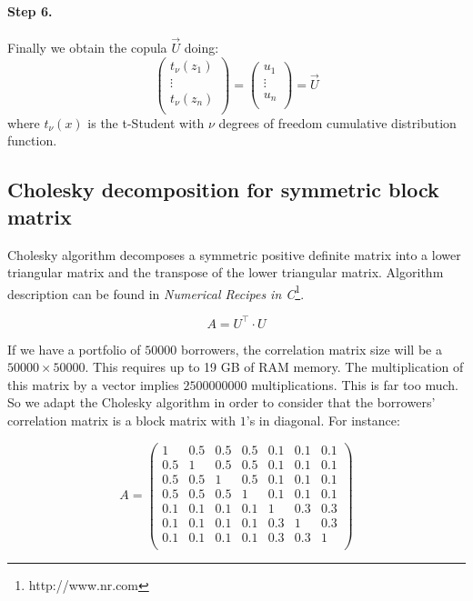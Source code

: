 \documentclass[a4paper,12pt,final]{article}
\begin{document}
\paragraph{Step 6.} Finally we obtain the copula $\vec{U}$ doing:
\begin{displaymath}
\left(
\begin{array}{c}
t_\nu(z_1) \\
\vdots     \\
t_\nu(z_n) \\
\end{array}
\right) 
=
\left(
\begin{array}{c}
u_1    \\
\vdots \\
u_n    \\
\end{array}
\right) 
=
\vec{U} 
\end{displaymath}
where $t_\nu(x)$ is the t-Student with $\nu$ degrees of freedom cumulative distribution 
function.

\subsection{Cholesky decomposition for symmetric block matrix}
\label{ap:cholblock}

Cholesky algorithm decomposes a symmetric positive definite matrix into a lower
triangular matrix and the transpose of the lower triangular matrix. Algorithm 
description can be found in \emph{Numerical Recipes in C}\footnote{http://www.nr.com}.

\begin{displaymath}
A = U^{\top} \cdot U
\end{displaymath}

If we have a portfolio of $50000$ borrowers, the correlation matrix size will
be a $50000 \times 50000$. This requires up to 19 GB of RAM memory. The 
multiplication of this matrix by a vector implies $2500000000$ multiplications.
This is far too much. So we adapt the Cholesky algorithm in order to consider that 
the borrowers' correlation matrix is a block matrix with $1$'s in diagonal. 
For instance:

\begin{displaymath}
A = \left(
\begin{array}{cccc|ccc}
1   & 0.5 & 0.5 & 0.5 & 0.1 & 0.1 & 0.1 \\
0.5 & 1   & 0.5 & 0.5 & 0.1 & 0.1 & 0.1 \\
0.5 & 0.5 & 1   & 0.5 & 0.1 & 0.1 & 0.1 \\
0.5 & 0.5 & 0.5 & 1   & 0.1 & 0.1 & 0.1 \\
\hline
0.1 & 0.1 & 0.1 & 0.1 & 1   & 0.3 & 0.3 \\
0.1 & 0.1 & 0.1 & 0.1 & 0.3 & 1   & 0.3 \\
0.1 & 0.1 & 0.1 & 0.1 & 0.3 & 0.3 & 1   \\
\end{array}
\right)
\end{displaymath}
\end{document}
